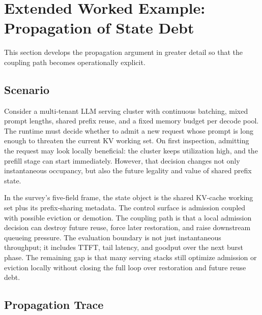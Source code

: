 \section{Extended Worked Example: Propagation of State Debt}

This section develops the propagation argument in greater detail so that the coupling path becomes operationally explicit.

\subsection{Scenario}

Consider a multi-tenant LLM serving cluster with continuous batching, mixed prompt lengths, shared prefix reuse, and a fixed memory budget per decode pool. The runtime must decide whether to admit a new request whose prompt is long enough to threaten the current KV working set. On first inspection, admitting the request may look locally beneficial: the cluster keeps utilization high, and the prefill stage can start immediately. However, that decision changes not only instantaneous occupancy, but also the future legality and value of shared prefix state.

In the survey's five-field frame, the state object is the shared KV-cache working set plus its prefix-sharing metadata. The control surface is admission coupled with possible eviction or demotion. The coupling path is that a local admission decision can destroy future reuse, force later restoration, and raise downstream queueing pressure. The evaluation boundary is not just instantaneous throughput; it includes TTFT, tail latency, and goodput over the next burst phase. The remaining gap is that many serving stacks still optimize admission or eviction locally without closing the full loop over restoration and future reuse debt.

\subsection{Propagation Trace}

